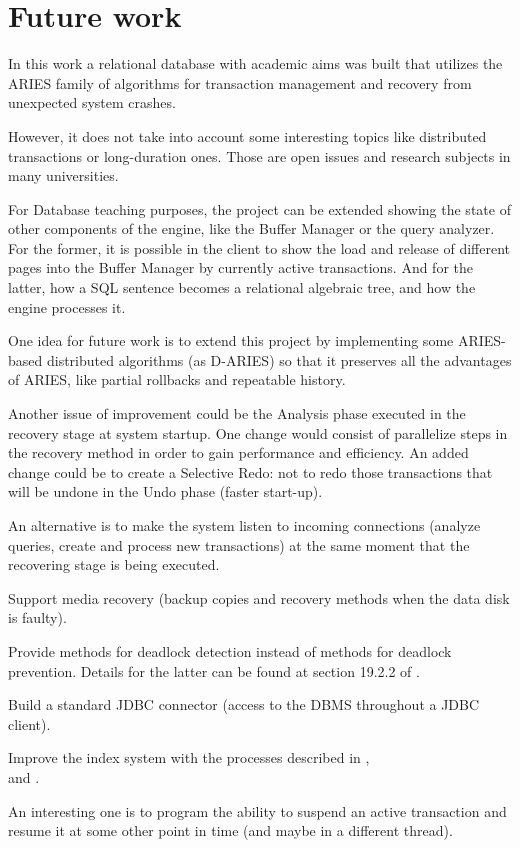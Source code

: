 \section{Future work}
In this work a relational database with academic aims was built that utilizes the ARIES family of algorithms for transaction management and recovery from unexpected system crashes.

However, it does not take into account some interesting topics like distributed transactions or long-duration ones. Those are open issues and research subjects in many universities.

For Database teaching purposes, the project can be extended showing the state of other components of the engine, like the Buffer Manager or the query analyzer. For the former, it is possible in the client to show the load and release of different pages into the Buffer Manager by currently active transactions. And for the latter, how a SQL sentence becomes a relational algebraic tree, and how the engine processes it.

One idea for future work is to extend this project by implementing some ARIES-based distributed algorithms (as D-ARIES) so that it preserves all the advantages of ARIES, like partial rollbacks and repeatable history.

Another issue of improvement could be the Analysis phase executed in the recovery stage at system startup. One change would consist of parallelize steps in the recovery method in order to gain performance
and efficiency. An added change could be to create a Selective Redo: not to redo those transactions that will be undone in the Undo phase (faster start-up).

An alternative is to make the system listen to incoming connections (analyze queries, create and process new transactions) at the same moment that the recovering stage is being executed.

Support media recovery (backup copies and recovery methods when the data disk is faulty).

Provide methods for deadlock detection instead of methods for deadlock prevention. 
Details for the latter can be found at section 19.2.2 of \cite{RaGh03}.
 
Build a standard JDBC connector (access to the DBMS throughout a JDBC client).

Improve the index system with the processes described in \cite{MoLe92}, \\\cite{Moha90} and \cite{Moha93}.

An interesting one is to program the ability to suspend an active transaction and resume it at some other point in time (and maybe in a different thread).
